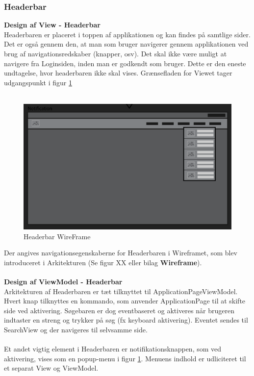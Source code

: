 \documentclass[Rapport/Rapport_main.tex]{subfiles}
\begin{document}
\subsubsection{Headerbar}
\textbf{Design af View - Headerbar}\\
Headerbaren er placeret i toppen af applikationen og kan findes på samtlige sider. Det er også gennem den, at man som bruger navigerer gennem applikationen ved brug af navigationsredskaber (knapper, osv). Det skal ikke være muligt at navigere fra Loginsiden, inden man er godkendt som bruger. Dette er den eneste undtagelse, hvor headerbaren ikke skal vises. Grænsefladen for Viewet tager udgangspunkt i figur \ref{fig:headerbar_wf}\\\\
\begin{figure}[H]
    \centering
    \includegraphics[width=\textwidth]{SoftwareDesign/MVVMDesigns/Graphics/HeaderBarWireFrame.png}
    \caption{Headerbar WireFrame}
    \label{fig:headerbar_wf}
\end{figure}
Der angives navigationsegenskaberne for Headerbaren i Wireframet, som blev introduceret i Arkitekturen (Se figur XX eller bilag \textbf{Wireframe}). \\\\
\textbf{Design af ViewModel - Headerbar}\\
Arkitekturen af Headerbaren er tæt tilknyttet til ApplicationPageViewModel. Hvert knap tilknyttes en kommando, som anvender ApplicationPage til at skifte side ved aktivering. Søgebaren er dog eventbaseret og aktiveres når brugeren indtaster en streng og trykker på søg (fx keyboard aktivering). Eventet sendes til SearchView og der navigeres til selvsamme side. \\\\
Et andet vigtig element i Headerbaren er notifikationsknappen, som ved aktivering, vises som en popup-menu i figur \ref{fig:headerbar_wf}. Menuens indhold er udliciteret til et separat View og ViewModel. 
\end{document}
